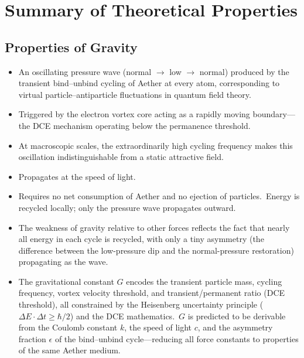﻿\documentclass[12pt,letterpaper]{article}
\begin{document}

\section{Summary of Theoretical Properties}

\subsection{Properties of Gravity}

\begin{itemize}[leftmargin=2em]
  \item An oscillating pressure wave (normal $\rightarrow$ low $\rightarrow$ normal) produced by the transient
    bind--unbind cycling of Aether at every atom, corresponding to virtual particle--antiparticle fluctuations in quantum field theory.
  \item Triggered by the electron vortex core acting as a rapidly moving boundary---the
    DCE mechanism operating below the permanence threshold.
  \item At macroscopic scales, the extraordinarily high cycling frequency makes this
    oscillation indistinguishable from a static attractive field.
  \item Propagates at the speed of light.
  \item Requires no net consumption of Aether and no ejection of particles.\ Energy is
    recycled locally; only the pressure wave propagates outward.
  \item The weakness of gravity relative to other forces reflects the fact that nearly all
    energy in each cycle is recycled, with only a tiny asymmetry (the difference between
    the low-pressure dip and the normal-pressure restoration) propagating as the wave.
  \item The gravitational constant $G$ encodes the transient particle mass, cycling frequency,
    vortex velocity threshold, and transient/permanent ratio (DCE threshold), all constrained by
    the Heisenberg uncertainty principle ($\Delta E \cdot \Delta t \geq \hbar/2$) and the DCE
    mathematics.\ $G$ is predicted to be derivable from the Coulomb constant $k$, the speed of
    light $c$, and the asymmetry fraction $\epsilon$ of the bind--unbind cycle---reducing all
    force constants to properties of the same Aether medium.

\end{itemize}
\end{document}
